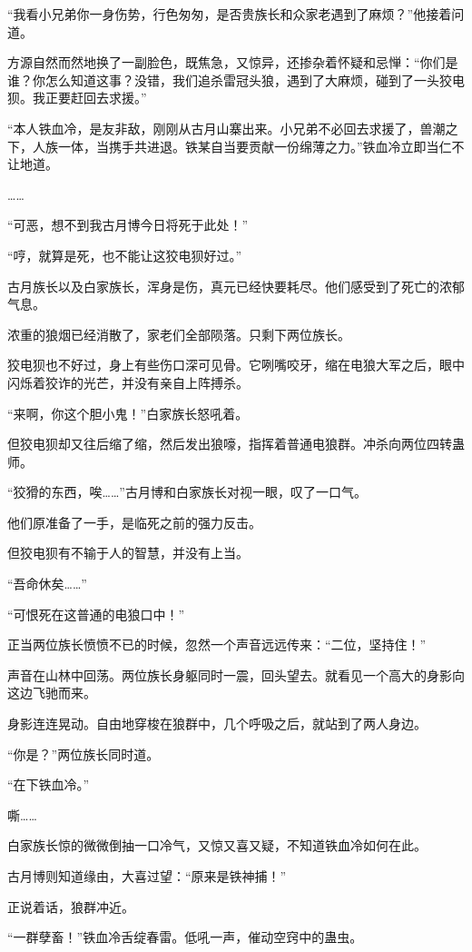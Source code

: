 \begin{this_body}
“我看小兄弟你一身伤势，行色匆匆，是否贵族长和众家老遇到了麻烦？”他接着问道。

方源自然而然地换了一副脸色，既焦急，又惊异，还掺杂着怀疑和忌惮：“你们是谁？你怎么知道这事？没错，我们追杀雷冠头狼，遇到了大麻烦，碰到了一头狡电狈。我正要赶回去求援。”

“本人铁血冷，是友非敌，刚刚从古月山寨出来。小兄弟不必回去求援了，兽潮之下，人族一体，当携手共进退。铁某自当要贡献一份绵薄之力。”铁血冷立即当仁不让地道。

……

“可恶，想不到我古月博今日将死于此处！”

“哼，就算是死，也不能让这狡电狈好过。”

古月族长以及白家族长，浑身是伤，真元已经快要耗尽。他们感受到了死亡的浓郁气息。

浓重的狼烟已经消散了，家老们全部陨落。只剩下两位族长。

狡电狈也不好过，身上有些伤口深可见骨。它咧嘴咬牙，缩在电狼大军之后，眼中闪烁着狡诈的光芒，并没有亲自上阵搏杀。

“来啊，你这个胆小鬼！”白家族长怒吼着。

但狡电狈却又往后缩了缩，然后发出狼嚎，指挥着普通电狼群。冲杀向两位四转蛊师。

“狡猾的东西，唉……”古月博和白家族长对视一眼，叹了一口气。

他们原准备了一手，是临死之前的强力反击。

但狡电狈有不输于人的智慧，并没有上当。

“吾命休矣……”

“可恨死在这普通的电狼口中！”

正当两位族长愤愤不已的时候，忽然一个声音远远传来：“二位，坚持住！”

声音在山林中回荡。两位族长身躯同时一震，回头望去。就看见一个高大的身影向这边飞驰而来。

身影连连晃动。自由地穿梭在狼群中，几个呼吸之后，就站到了两人身边。

“你是？”两位族长同时道。

“在下铁血冷。”

嘶……

白家族长惊的微微倒抽一口冷气，又惊又喜又疑，不知道铁血冷如何在此。

古月博则知道缘由，大喜过望：“原来是铁神捕！”

正说着话，狼群冲近。

“一群孽畜！”铁血冷舌绽春雷。低吼一声，催动空窍中的蛊虫。


\end{this_body}
